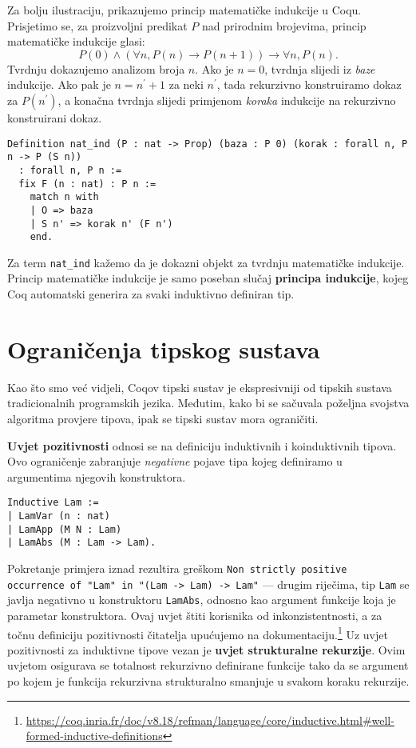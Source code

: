 Za bolju ilustraciju, prikazujemo princip matematičke indukcije u Coqu.
Prisjetimo se, za proizvoljni predikat \(P\) nad prirodnim brojevima, princip matematičke indukcije glasi:
\[
  P(0) \land (\forall n, P(n) \rightarrow P(n + 1)) \rightarrow \forall n, P(n).
\]
\noindent Tvrdnju dokazujemo analizom broja \(n\).
Ako je \(n = 0\), tvrdnja slijedi iz \textit{baze} indukcije.
Ako pak je \(n = n^{\prime} + 1\) za neki \(n^{\prime}\), tada rekurzivno konstruiramo dokaz za \(P(n^{\prime})\), a konačna tvrdnja slijedi primjenom \textit{koraka} indukcije na rekurzivno konstruirani dokaz.
\begin{verbatim}
Definition nat_ind (P : nat -> Prop) (baza : P 0) (korak : forall n, P n -> P (S n))
  : forall n, P n :=
  fix F (n : nat) : P n :=
    match n with
    | O => baza
    | S n' => korak n' (F n')
    end.
\end{verbatim}
Za term \texttt{nat\_ind} kažemo da je dokazni objekt  za tvrdnju matematičke indukcije.
Princip matematičke indukcije je samo poseban slučaj \textbf{principa indukcije}, kojeg Coq automatski generira za svaki induktivno definiran tip.

\section{Ograničenja tipskog sustava}\label{sec:ogranicenja}
Kao što smo već vidjeli, Coqov tipski sustav je ekspresivniji od tipskih sustava tradicionalnih programskih jezika.
Međutim, kako bi se sačuvala poželjna svojstva algoritma provjere tipova, ipak se tipski sustav mora ograničiti.

\textbf{Uvjet pozitivnosti} odnosi se na definiciju induktivnih i koinduktivnih tipova.
Ovo ograničenje zabranjuje \textit{negativne} pojave tipa kojeg definiramo u argumentima njegovih konstruktora.
\begin{verbatim}
Inductive Lam :=
| LamVar (n : nat)
| LamApp (M N : Lam)
| LamAbs (M : Lam -> Lam).
\end{verbatim}
\noindent Pokretanje primjera iznad rezultira greškom \texttt{Non strictly positive occurrence of "Lam" in "(Lam -> Lam) -> Lam"} ---
drugim riječima, tip \texttt{Lam} se javlja negativno u konstruktoru \texttt{LamAbs}, odnosno kao argument funkcije koja je parametar konstruktora.
Ovaj uvjet štiti korisnika od inkonzistentnosti, a za točnu definiciju pozitivnosti čitatelja upućujemo na dokumentaciju.\footnote{\url{https://coq.inria.fr/doc/v8.18/refman/language/core/inductive.html\#well-formed-inductive-definitions}}
Uz uvjet pozitivnosti za induktivne tipove vezan je \textbf{uvjet strukturalne rekurzije}.
Ovim uvjetom osigurava se totalnost rekurzivno definirane funkcije
tako da se argument po kojem je funkcija rekurzivna strukturalno smanjuje u svakom koraku rekurzije.

